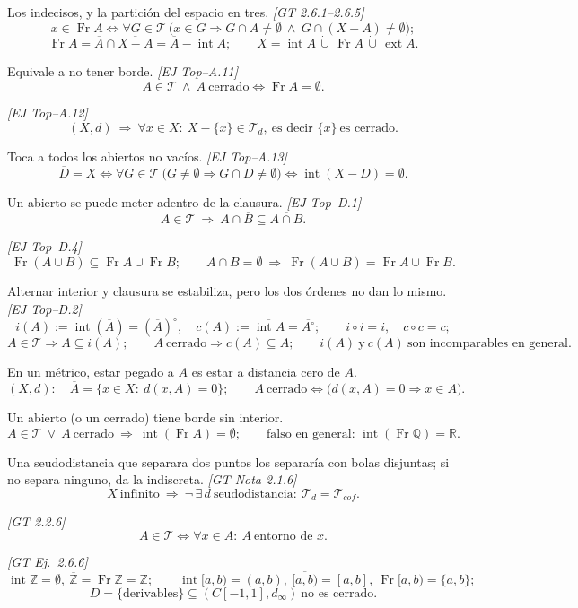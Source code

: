 \documentclass[11pt,a4paper]{article}
\theoremstyle{definition}
\theoremstyle{plain}
\newcommand{\fnt}[1]{{\normalfont\small\itshape\color{gray!150!black}[#1]}}
\newcommand{\R}{\mathbb{R}}
\newcommand{\Z}{\mathbb{Z}}
\newcommand{\Q}{\mathbb{Q}}
\newcommand{\cl}[1]{\overline{#1}}
\newcommand{\intr}{\operatorname{int}}
\newcommand{\fr}{\operatorname{Fr}}
\newcommand{\ext}{\operatorname{ext}}
\newcommand{\tp}{\mathcal{T}}
\begin{document}
\begin{itemize}[leftmargin=1.3em,itemsep=3pt]
 Los indecisos, y la partición del espacio en tres. \fnt{GT 2.6.1--2.6.5}
\[ x\in\fr A\iff \forall G\in\tp\ \big(x\in G\Rightarrow G\cap A\ne\emptyset\ \wedge\ G\cap(X-A)\ne\emptyset\big); \]
\[ \fr A=\cl A\cap\cl{X-A}=\cl A-\intr A;\qquad X=\intr A\,\dot\cup\,\fr A\,\dot\cup\,\ext A. \]

 Equivale a no tener borde. \fnt{EJ Top--A.11}
\[ A\in\tp\ \wedge\ A\ \text{cerrado}\iff \fr A=\emptyset. \]

 \fnt{EJ Top--A.12}
\[ (X,d)\ \Rightarrow\ \forall x\in X:\ X-\{x\}\in\tp_d, \ \text{es decir } \{x\}\ \text{es cerrado}. \]

 Toca a todos los abiertos no vacíos. \fnt{EJ Top--A.13}
\[ \cl D=X\iff \forall G\in\tp\ \big(G\ne\emptyset\Rightarrow G\cap D\ne\emptyset\big)\iff \intr(X-D)=\emptyset. \]

 Un abierto se puede meter adentro de la clausura. \fnt{EJ Top--D.1}
\[ A\in\tp\ \Rightarrow\ A\cap\cl B\subseteq\cl{A\cap B}. \]

 \fnt{EJ Top--D.4}
\[ \fr(A\cup B)\subseteq\fr A\cup\fr B;\qquad \cl A\cap\cl B=\emptyset\ \Rightarrow\ \fr(A\cup B)=\fr A\cup\fr B. \]

 Alternar interior y clausura se estabiliza, pero los dos órdenes no dan lo mismo. \fnt{EJ Top--D.2}
\[ i(A):=\intr(\cl A)=(\cl A)^{\circ},\quad c(A):=\cl{\intr A}=\cl{A^{\circ}};\qquad i\circ i=i,\quad c\circ c=c; \]
\[ A\in\tp\Rightarrow A\subseteq i(A);\qquad A\ \text{cerrado}\Rightarrow c(A)\subseteq A;\qquad i(A)\ \text{y}\ c(A)\ \text{son incomparables en general}. \]

 En un métrico, estar pegado a $A$ es estar a distancia cero de $A$.
\[ (X,d):\quad \cl A=\{x\in X:\ d(x,A)=0\};\qquad A\ \text{cerrado}\iff \big(d(x,A)=0\Rightarrow x\in A\big). \]

 Un abierto (o un cerrado) tiene borde sin interior.
\[ A\in\tp\ \vee\ A\ \text{cerrado}\ \Rightarrow\ \intr(\fr A)=\emptyset;\qquad \text{falso en general: } \intr(\fr\Q)=\R. \]

 Una seudodistancia que separara dos puntos los separaría con bolas disjuntas; si no separa ninguno, da la indiscreta. \fnt{GT Nota 2.1.6}
\[ X\ \text{infinito}\ \Rightarrow\ \neg\,\exists\,d\ \text{seudodistancia}:\ \tp_d=\tp_{cof}. \]

 \fnt{GT 2.2.6}
\[ A\in\tp\iff \forall x\in A:\ A\ \text{entorno de } x. \]

 \fnt{GT Ej.\ 2.6.6}
\[ \intr\Z=\emptyset,\ \cl\Z=\fr\Z=\Z;\qquad \intr[a,b)=(a,b),\ \cl{[a,b)}=[a,b],\ \fr[a,b)=\{a,b\}; \]
\[ D=\{\text{derivables}\}\subseteq(C[-1,1],d_\infty)\ \text{no es cerrado}. \]

\end{itemize}
\end{document}
